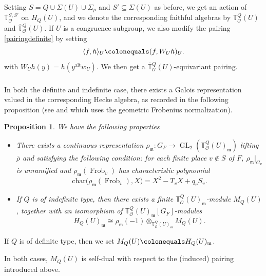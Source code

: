 \documentclass[a4paper, notitlepage, 10pt]{amsart}
\theoremstyle{plain} %
\newtheorem{proposition}[theorem]{Proposition}
\theoremstyle{definition} %
\theoremstyle{remark} %
\numberwithin{equation}{section}
\newcommand{\bbT}{\mathbb T}
\newcommand{\GL}{\operatorname{GL}} %
\newcommand{\Frob}{\operatorname{Frob}} %
\newcommand{\alt}{\operatorname{alt}}
\begin{document}
Setting $S=Q\cup\Sigma(U)\cup \Sigma_p$ and $S'\subseteq\Sigma(U)$ as before, we get an action of $\overline{\bbT}{}^{S,S'}_{\mathcal{O}}$ on $H_Q(U)$, and we denote the corresponding faithful algebras by $\bbT^Q_{\mathcal{O}}(U)$ and $\overline{\bbT}{}^Q_{\mathcal{O}}(U)$. If $U$ is a congruence subgroup, we also modify the pairing \eqref{pairingdefinite} by setting
$$ \langle f,h\rangle_U\colonequals (f, W_U h)_U.$$
with $W_Uh(y)=h(y^{\alt}w_U)$. We then get a $\overline{\bbT}{}^Q_{\mathcal{O}}(U)$-equivariant pairing.

\subsubsection{} \noindent In both the definite and indefinite case, there exists a Galois representation valued in the corresponding Hecke algebra, as recorded in the following proposition (see \cite[(3.4.1)]{Kis09} and \cite[Proposition 4.7]{Tho16} which uses the geometric Frobenius normalization).
\begin{proposition}\label{Tgaloisrep}
We have the following properties
\begin{itemize}
    \item[(1)] There exists a continuous representation $\rho_{\mathfrak{m}}\colon G_F \rightarrow \GL_2(\mathbb{T}^{Q}_{\mathcal{O}}(U)_{\mathfrak{m}})$ lifting $\overline{\rho}$ and satisfying the following condition: for each finite place $v\not\in S$ of $F$, $\rho_{\mathfrak{m}}|_{G_{v}}$ is unramified and $\rho_{\mathfrak{m}}(\Frob_v)$ has characteristic polynomial
    $$ \mathrm{char}\big(\rho_{\mathfrak{m}}(\Frob_v),X\big)= X^2-T_vX+q_vS_v. $$
    \item[(2)] If $Q$ is of indefinite type, then there exists a finite $\mathbb{T}^Q_{\mathcal{O}}(U)_{\mathfrak{m}}$-module $M_Q(U)$, together with an isomorphism of $\mathbb{T}^{Q}_{\mathcal{O}}(U)_{\mathfrak{m}}[G_F]$-modules
    $$ H_Q(U)_{\mathfrak{m}} \cong \rho_{\mathfrak{m}}(-1)\otimes_{\mathbb{T}^Q_{\mathcal{O}}(U)_{\mathfrak{m}}} M_Q(U). $$
 \end{itemize}
\end{proposition}


If $Q$ is of definite type, then we set $M_Q(U)\colonequals H_Q(U)_{\mathfrak{m}}$. 

In both cases, $M_Q(U)$ is self-dual with respect to the (induced) pairing introduced above.
\end{document}

